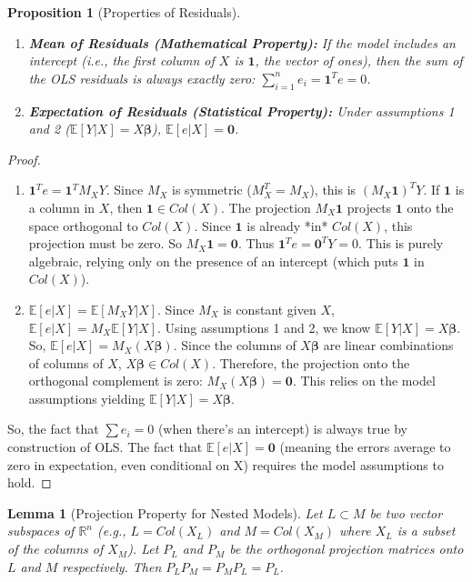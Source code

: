 \documentclass[11pt]{article}
\newtheorem{lemma}[theorem]{Lemma}
\newtheorem{proposition}[theorem]{Proposition}
\theoremstyle{definition}
\newcommand{\R}{\mathbb{R}} %
\newcommand{\E}{\mathbb{E}} %
\newcommand{\T}{^T} %
\newcommand{\bbeta}{\bm{\beta}} %
\newcommand{\bZero}{\mathbf{0}} %
\begin{document}
\begin{proposition}[Properties of Residuals]
\label{prop:residual_properties}
\begin{enumerate}
    \item \textbf{Mean of Residuals (Mathematical Property):} If the model includes an intercept (i.e., the first column of $X$ is $\mathbf{1}$, the vector of ones), then the sum of the OLS residuals is always exactly zero: $\sum_{i=1}^n e_i = \mathbf{1}\T e = 0$.
    \item \textbf{Expectation of Residuals (Statistical Property):} Under assumptions 1 and 2 ($\E[Y|X]=X\bbeta$), $\E[e | X] = \bZero$.
\end{enumerate}
\end{proposition}

\begin{proof}
\begin{enumerate}
    \item $\mathbf{1}\T e = \mathbf{1}\T M_X Y$. Since $M_X$ is symmetric ($M_X\T = M_X$), this is $(M_X \mathbf{1})\T Y$. If $\mathbf{1}$ is a column in $X$, then $\mathbf{1} \in Col(X)$. The projection $M_X \mathbf{1}$ projects $\mathbf{1}$ onto the space orthogonal to $Col(X)$. Since $\mathbf{1}$ is already *in* $Col(X)$, this projection must be zero. So $M_X \mathbf{1} = \bZero$. Thus $\mathbf{1}\T e = \bZero\T Y = 0$. This is purely algebraic, relying only on the presence of an intercept (which puts $\mathbf{1}$ in $Col(X)$).
    \item $\E[e | X] = \E[M_X Y | X]$. Since $M_X$ is constant given $X$, $\E[e | X] = M_X \E[Y | X]$. Using assumptions 1 and 2, we know $\E[Y|X]=X\bbeta$. So, $\E[e | X] = M_X (X\bbeta)$. Since the columns of $X\bbeta$ are linear combinations of columns of $X$, $X\bbeta \in Col(X)$. Therefore, the projection onto the orthogonal complement is zero: $M_X (X\bbeta) = \bZero$. This relies on the model assumptions yielding $\E[Y|X]=X\bbeta$.
\end{enumerate}
So, the fact that $\sum e_i = 0$ (when there's an intercept) is always true by construction of OLS. The fact that $\E[e | X] = \bZero$ (meaning the errors average to zero in expectation, even conditional on X) requires the model assumptions to hold.
\end{proof}

\begin{lemma}[Projection Property for Nested Models]
\label{lem:nested_projection}
Let $L \subset M$ be two vector subspaces of $\R^n$ (e.g., $L = Col(X_L)$ and $M = Col(X_M)$ where $X_L$ is a subset of the columns of $X_M$). Let $P_L$ and $P_M$ be the orthogonal projection matrices onto $L$ and $M$ respectively. Then $P_L P_M = P_M P_L = P_L$.
\end{lemma}
\end{document}
